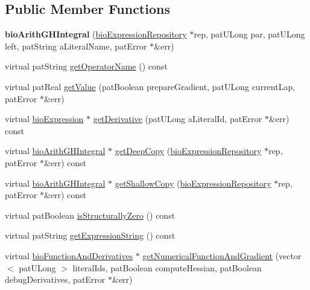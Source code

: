 \subsection*{Public Member Functions}
\begin{DoxyCompactItemize}
\item 
\mbox{\label{classbio_arith_g_h_integral_a01934487b2480803d990b9575c19ef2a}} 
{\bfseries bio\+Arith\+G\+H\+Integral} (\hyperlink{classbio_expression_repository}{bio\+Expression\+Repository} $\ast$rep, pat\+U\+Long par, pat\+U\+Long left, pat\+String a\+Literal\+Name, pat\+Error $\ast$\&err)
\item 
virtual pat\+String \hyperlink{classbio_arith_g_h_integral_a2eeabe5fdedaee0370596b34d7731b77}{get\+Operator\+Name} () const
\item 
virtual pat\+Real \hyperlink{classbio_arith_g_h_integral_a6eecafaf8d88fc08dfc8c4feb2d68ffd}{get\+Value} (pat\+Boolean prepare\+Gradient, pat\+U\+Long current\+Lap, pat\+Error $\ast$\&err)
\item 
virtual \hyperlink{classbio_expression}{bio\+Expression} $\ast$ \hyperlink{classbio_arith_g_h_integral_a3e017f569acbc481366ad4472ee2734d}{get\+Derivative} (pat\+U\+Long a\+Literal\+Id, pat\+Error $\ast$\&err) const
\item 
virtual \hyperlink{classbio_arith_g_h_integral}{bio\+Arith\+G\+H\+Integral} $\ast$ \hyperlink{classbio_arith_g_h_integral_a4864f99351baa9b168451d2356d2e7bf}{get\+Deep\+Copy} (\hyperlink{classbio_expression_repository}{bio\+Expression\+Repository} $\ast$rep, pat\+Error $\ast$\&err) const
\item 
virtual \hyperlink{classbio_arith_g_h_integral}{bio\+Arith\+G\+H\+Integral} $\ast$ \hyperlink{classbio_arith_g_h_integral_a15d9820a85bd45e3643c6bd15752cfe2}{get\+Shallow\+Copy} (\hyperlink{classbio_expression_repository}{bio\+Expression\+Repository} $\ast$rep, pat\+Error $\ast$\&err) const
\item 
virtual pat\+Boolean \hyperlink{classbio_arith_g_h_integral_a86510e9d5d13234c931278ec496e1aec}{is\+Structurally\+Zero} () const
\item 
virtual pat\+String \hyperlink{classbio_arith_g_h_integral_aa245fc792bcd733e143896c9f8d33a64}{get\+Expression\+String} () const
\item 
virtual \hyperlink{classbio_function_and_derivatives}{bio\+Function\+And\+Derivatives} $\ast$ \hyperlink{classbio_arith_g_h_integral_a2148674c32e7bea35d7e6ef275c2f7f5}{get\+Numerical\+Function\+And\+Gradient} (vector$<$ pat\+U\+Long $>$ literal\+Ids, pat\+Boolean compute\+Hessian, pat\+Boolean debug\+Derivatives, pat\+Error $\ast$\&err)
\end{DoxyCompactItemize}
